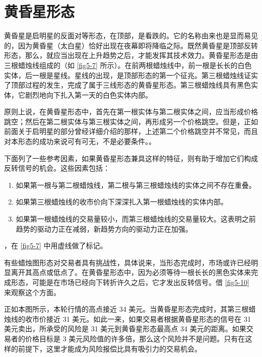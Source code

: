 \section{黄昏星形态}
黄昏星是启明星的反面对等形态，在顶部，是看跌的。它的名称由来也是显而易见的，因为黄昏星（太白星）恰好出现在夜幕即将降临之际。既然黄昏星是顶部反转形态，那么，就应当出现在上升趋势之后，才能发挥其技术效力。黄昏星形态是由三根蜡烛线组成的（如 \autoref{fig5-7} 所示）。在前两根蜡烛线中，前一根是长长的白色实体，后一根是星线。星线的出现，是顶部形态的第一个征兆。第三根蜡烛线证实了顶部过程的发生，完成了属于三线形态的黄昏星形态。第三根蜡烛线具有黑色实体，它剧烈地向下扎入第一天的白色实体内部。

原则上说，在黄昏星形态中，首先在第一根实体与第二根实体之间，应当形成价格跳空；然后在第二根实体与第三根实体之间，再形成另一个价格跳空。但是，正如前面关于启明星的部分曾经详细介绍的那样，上述第二个价格跳空并不常见，而且对本形态的成功来说可有可无，不是必要条件。。


下面列了一些参考因素，如果黄昏星形态兼具这样的特征，则有助于增加它们构成反转信号的机会。这些因素包括：
\begin{enumerate}
    \item 如果第一根与第二根蜡烛线，第二根与第三根蜡烛线的实体之间不存在重叠。
    \item 如果第三根蜡烛线的收市价向下深深扎入第一根蜡烛线的实体内部。
    \item 如果第一根蜡烛线的交易量较小，而第三根蜡烛线的交易量较大。这表明之前趋势的驱动力正在减弱，新趋势方向的驱动力正在加强。
\end{enumerate}

，在 \autoref{fig5-7} 中用虚线做了标记。

有些蜡烛图形态对交易者具有挑战性，具体说来，当形态完成时，市场或许已经明显离开其高点或低点了。在黄昏星形态中，因为必须等待一根长长的黑色实体来完成形态，可能是在市场已经向下转折许久之后，它才发出反转信号。借 \autoref{fig5-10} 来观察这个方面。

正如本图所示，本轮行情的高点接近 34 美元。当黄昏星形态完成时，其第三根蜡烛线的收市价接近 31 美元。如此一来，如果交易者根据黄昏星形态的信号在 31 美元卖出，所承受的风险是 31 美元到黄昏星形态最高点 34 美元的距离。如果交易者的价格目标是 3 美元风险值的许多倍，那么这个风险并不是问题。只有在这样的前提下，这里才能成为风险报偿比具有吸引力的交易机会。

